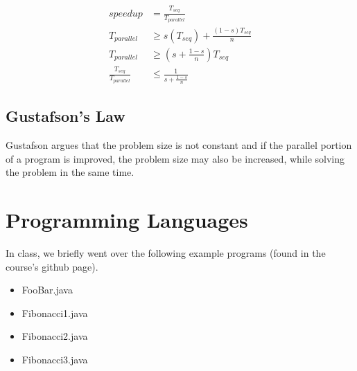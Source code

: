 \documentclass[twoside]{article}
\begin{document}
\begin{align*}
 speedup &= \frac{T_{seq}}{T_{parallel}}\\
 T_{parallel} &\geq s(T_{seq}) + \frac{(1 - s) T_{seq}}{n} \\
 T_{parallel} &\geq (s + \frac{1 -s }{n}) T_{seq} \\
 \frac{T_{seq}}{T_{parallel}} &\leq \frac{1}{s + \frac{1 - s}{n}}
\end{align*}


\subsection{Gustafson's Law}

Gustafson argues that the problem size is not constant and if the parallel portion of a program is improved,
the problem size may also be increased, while solving the problem in the same time.

\section{Programming Languages}

In class, we briefly went over the following example programs (found in the course's github page).

\begin{itemize}
 \item FooBar.java
 \item Fibonacci1.java
 \item Fibonacci2.java
 \item Fibonacci3.java
\end{itemize}
\end{document}
